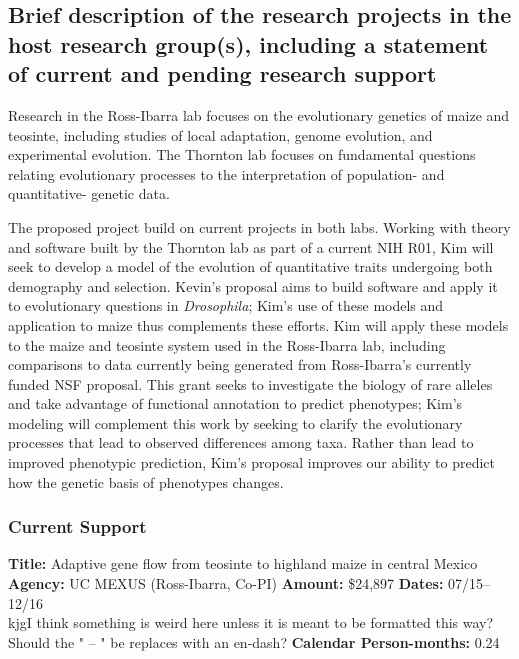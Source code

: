 \renewcommand{\thepage}{Sponsoring Scientist Statement - Page \arabic{page} of 3}

\subsection{Brief description of the research projects in the host research group(s), including a statement of current and pending research support}

Research in the Ross-Ibarra lab focuses on the evolutionary genetics of maize and teosinte, including studies of local adaptation, genome evolution, and experimental evolution. 
The Thornton lab focuses on fundamental questions relating evolutionary processes to the interpretation of population- and quantitative- genetic data. 

The proposed project build on current projects in both labs. Working with theory and software built by the Thornton lab as part of a current NIH R01, Kim will seek to develop a model of the evolution of quantitative traits undergoing both demography and selection. Kevin's  proposal aims to build software and apply it to evolutionary questions in \emph{Drosophila}; Kim's use of these models and application to maize thus complements these efforts.  Kim will apply these models to the maize and teosinte system used in the Ross-Ibarra lab, including comparisons to data currently being generated from Ross-Ibarra's currently funded NSF proposal. This grant seeks to investigate the biology of rare alleles and take advantage of functional annotation to predict phenotypes; Kim's modeling will complement this work by seeking to clarify the evolutionary processes that lead to observed differences among taxa. Rather than lead to improved phenotypic prediction, Kim's proposal improves our ability to predict how the genetic basis of phenotypes changes.

\subsubsection*{Current Support}

\textbf{Title:} Adaptive gene flow from teosinte to highland maize in central Mexico
\textbf{Agency:} UC MEXUS (Ross-Ibarra, Co-PI)
\textbf{Amount:} \$24,897
\textbf{Dates:} 07/15– 12/16 \\kjg{I think something is weird here unless it is meant to be formatted this way? Should the " – " be replaces with an en-dash?}
\textbf{Calendar Person-months:} 0.24

